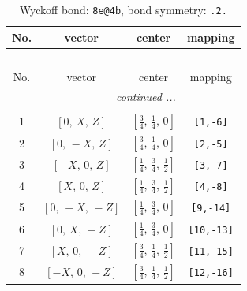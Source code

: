 \documentclass[fleqn,8pt]{jsarticle}
\begin{document}
\begin{longtable}{cccc}
\caption{Wyckoff bond: {\tt 8e@4b}, bond symmetry: {\tt .2.}}
 \\
 \hline \hline
No. & vector & center & mapping \\ \hline \endfirsthead

\multicolumn{3}{l}{\tablename\ \thetable{}} \\
 \hline \hline
No. & vector & center & mapping \\ \hline \endhead

 \hline \hline
\multicolumn{3}{r}{\footnotesize\it continued ...} \\ \endfoot

 \hline \hline
\multicolumn{3}{r}{} \\ \endlastfoot

1 & $\left[ 0,\, X,\, Z \right]$ & $\left[ \frac{3}{4},\, \frac{1}{4},\, 0 \right]$ & {\tt [1,-6]} \\ \hline
2 & $\left[ 0,\, - X,\, Z \right]$ & $\left[ \frac{3}{4},\, \frac{1}{4},\, 0 \right]$ & {\tt [2,-5]} \\ \hline
3 & $\left[ - X,\, 0,\, Z \right]$ & $\left[ \frac{1}{4},\, \frac{3}{4},\, \frac{1}{2} \right]$ & {\tt [3,-7]} \\ \hline
4 & $\left[ X,\, 0,\, Z \right]$ & $\left[ \frac{1}{4},\, \frac{3}{4},\, \frac{1}{2} \right]$ & {\tt [4,-8]} \\ \hline
5 & $\left[ 0,\, - X,\, - Z \right]$ & $\left[ \frac{1}{4},\, \frac{3}{4},\, 0 \right]$ & {\tt [9,-14]} \\ \hline
6 & $\left[ 0,\, X,\, - Z \right]$ & $\left[ \frac{1}{4},\, \frac{3}{4},\, 0 \right]$ & {\tt [10,-13]} \\ \hline
7 & $\left[ X,\, 0,\, - Z \right]$ & $\left[ \frac{3}{4},\, \frac{1}{4},\, \frac{1}{2} \right]$ & {\tt [11,-15]} \\ \hline
8 & $\left[ - X,\, 0,\, - Z \right]$ & $\left[ \frac{3}{4},\, \frac{1}{4},\, \frac{1}{2} \right]$ & {\tt [12,-16]} \\
\end{longtable}
\renewcommand{\arraystretch}{1.2}
\end{document}
